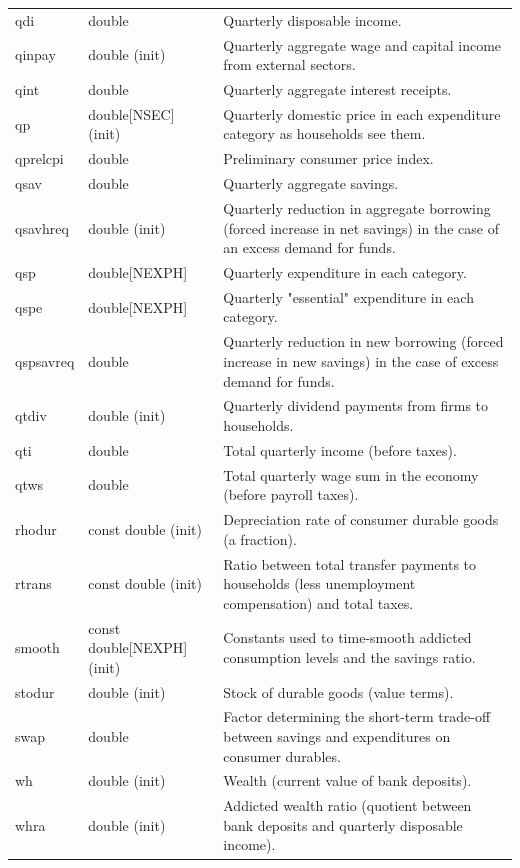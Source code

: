 \documentclass{article}
\begin{document}
\begin{longtable}{p{}p{}p{}}
qdi & double & Quarterly disposable income.\\
qinpay & double (init) & Quarterly aggregate wage and capital income from external sectors.\\
qint & double & Quarterly aggregate interest receipts.\\
qp & double[NSEC] (init) & Quarterly domestic price in each expenditure category as households see them.\\
qprelcpi & double & Preliminary consumer price index.\\
qsav & double & Quarterly aggregate savings.\\
qsavhreq & double (init) & Quarterly reduction in aggregate borrowing (forced increase in net savings) in the case of an excess demand for funds.\\
qsp & double[NEXPH] & Quarterly expenditure in each category.\\
qspe & double[NEXPH] & Quarterly "essential" expenditure in each category.\\
qspsavreq & double & Quarterly reduction in new borrowing (forced increase in new savings) in the case of excess demand for funds.\\
qtdiv & double (init) & Quarterly dividend payments from firms to households.\\
qti & double & Total quarterly income (before taxes).\\
qtws & double & Total quarterly wage sum in the economy (before payroll taxes).\\
rhodur & const double (init) & Depreciation rate of consumer durable goods (a fraction).\\
rtrans & const double (init) & Ratio between total transfer payments to households (less unemployment compensation) and total taxes.\\
smooth & const double[NEXPH] (init) & Constants used to time-smooth addicted consumption levels and the savings ratio.\\
stodur & double (init) & Stock of durable goods (value terms).\\
swap & double & Factor determining the short-term trade-off between savings and expenditures on consumer durables.\\
wh & double (init) & Wealth (current value of bank deposits).\\
whra & double (init) & Addicted wealth ratio (quotient between bank deposits and quarterly disposable income).\\
\midrule


\end{longtable}
\end{document}
